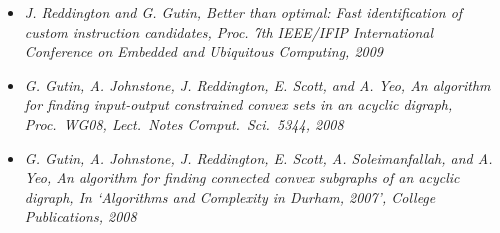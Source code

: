 \begin{itemize}
\item{\em J. Reddington and G. Gutin, Better than optimal: Fast identification of custom instruction candidates, Proc. 7th IEEE/IFIP International Conference on Embedded and Ubiquitous Computing, 2009}

\item{\em G. Gutin, A. Johnstone, J. Reddington, E. Scott, and A. Yeo, An algorithm for finding input-output constrained convex sets in an acyclic digraph, Proc.\ WG08, Lect.\ Notes Comput.\ Sci.\ 5344, 2008}

\item{\em G. Gutin, A. Johnstone, J. Reddington, E. Scott, A. Soleimanfallah, and A. Yeo, An algorithm for finding connected convex subgraphs of an acyclic digraph, In `Algorithms and Complexity in Durham, 2007', College Publications, 2008}

\end{itemize}
